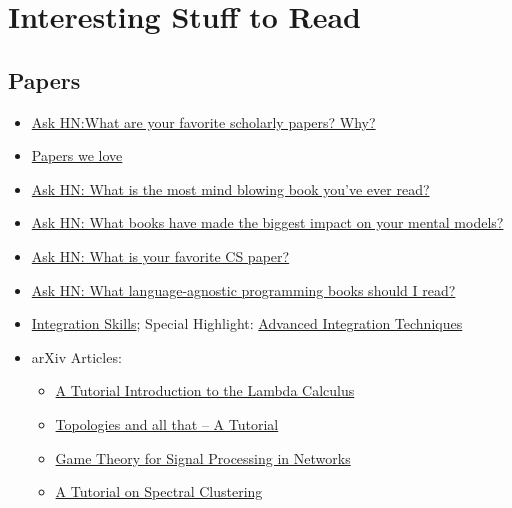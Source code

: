 \section{Interesting Stuff to Read}


\subsection{Papers}

\begin{itemize}
	\item \href{files/Ask HN_ What are your favorite scholarly papers_ Why_ _ Hacker News.pdf}{Ask HN:What are your favorite scholarly papers? Why?}
	
	\item \href{https://github.com/papers-we-love/papers-we-love}{Papers we
		love}

	\item \href{files/Ask HN_ What is the most mind blowing book you've ever read_ _ Hacker News.pdf}{Ask HN: What is the most mind blowing book you've ever read?}

	\item \href{files/Ask HN_ What books have made the biggest impact on your mental models_ _ Hacker News.pdf}{Ask HN: What books have made the biggest impact on your mental models?}

	\item \href{files/Ask HN_ What is your favorite CS paper_ _ Hacker News.pdf}{Ask HN: What is your favorite CS paper?}

	\item \href{files/Ask HN_ What language-agnostic programming books should I read_ _ Hacker News.pdf}{Ask HN: What language-agnostic programming books should I read?}

	\item \href{http://math.stackexchange.com/questions/765198/some-users-are-mind-bogglingly-skilled-at-integration-how-did-they-get-there/1063528\#1063528}{Integration
	Skills}; Special Highlight: \href{http://faculty.swosu.edu/michael.dougherty/book/chapter07.pdf}{Advanced
	Integration Techniques}

	\item arXiv Articles:

	\begin{itemize}
		\item \href{http://arxiv.org/abs/1503.09060}{A Tutorial Introduction to
			the Lambda Calculus}
		\item \href{http://arxiv.org/abs/1503.00875}{Topologies and all that -- A
			Tutorial}
		\item \href{http://arxiv.org/abs/1506.00982}{Game Theory for Signal
			Processing in Networks}
		\item \href{http://arxiv.org/abs/0711.0189}{A Tutorial on Spectral
			Clustering}
	\end{itemize}


\end{itemize}
